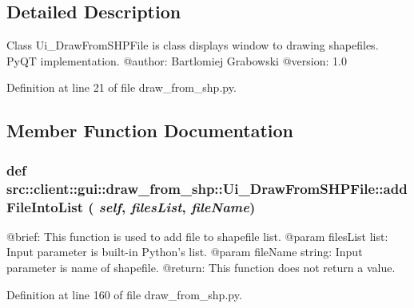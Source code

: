 \subsection{Detailed Description}
\begin{DoxyVerb}
Class Ui_DrawFromSHPFile is class displays window to drawing shapefiles. PyQT implementation.
@author: Bartlomiej Grabowski
@version: 1.0
\end{DoxyVerb}
 

Definition at line 21 of file draw\_\-from\_\-shp.py.



\subsection{Member Function Documentation}
\hypertarget{classsrc_1_1client_1_1gui_1_1draw__from__shp_1_1Ui__DrawFromSHPFile_a71c4f68638b94741c20553b65fbe825e}{
\subsubsection[{addFileIntoList}]{\setlength{\rightskip}{0pt plus 5cm}def src::client::gui::draw\_\-from\_\-shp::Ui\_\-DrawFromSHPFile::addFileIntoList ( {\em self}, \/   {\em filesList}, \/   {\em fileName})}}
\label{classsrc_1_1client_1_1gui_1_1draw__from__shp_1_1Ui__DrawFromSHPFile_a71c4f68638b94741c20553b65fbe825e}
\begin{DoxyVerb}
@brief: This function is used to add file to shapefile list.
@param filesList list: Input parameter is built-in Python's list.
@param fileName string: Input parameter is name of shapefile. 
@return: This function does not return a value.
\end{DoxyVerb}
 

Definition at line 160 of file draw\_\-from\_\-shp.py.

